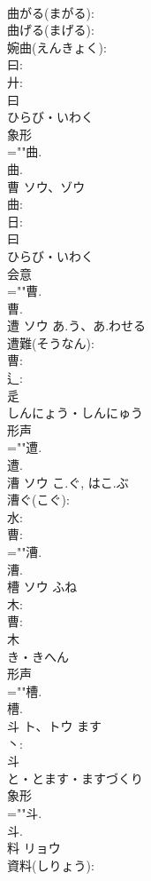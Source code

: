 \documentclass[8pt]{extreport}
\begin{document}
\begin{CJK}{UTF8}{min}
\\	曲がる(まがる): 
\\	曲げる(まげる): 
\\	婉曲(えんきょく): 
\\	曰: 
\\	廾: 
\\	曰	
\\	ひらび・いわく	
\\	象形 
\\	=""曲.
\\	曲.
\\	曹	ソウ、ゾウ			
\\	曲: 
\\	日: 
\\	曰	
\\	ひらび・いわく	
\\	会意 
\\	=""曹.
\\	曹.
\\	遭	ソウ	あ.う、あ.わせる		
\\	遭難(そうなん): 
\\	曹: 
\\	辶: 
\\	辵	
\\	しんにょう・しんにゅう	
\\	形声 
\\	=""遭.
\\	遭.
\\	漕	ソウ	こ.ぐ, はこ.ぶ		
\\	漕ぐ(こぐ): 
\\	水: 
\\	曹: 
\\	=""漕.
\\	漕.
\\	槽	ソウ	ふね		
\\	木: 
\\	曹: 
\\	木	
\\	き・きへん	
\\	形声 
\\	=""槽.
\\	槽.
\\	斗	ト、トウ		ます	
\\	丶: 
\\	斗	
\\	と・とます・ますづくり	
\\	象形 
\\	=""斗.
\\	斗.
\\	料	リョウ			
\\	資料(しりょう): 

\end{CJK}
\end{document}
